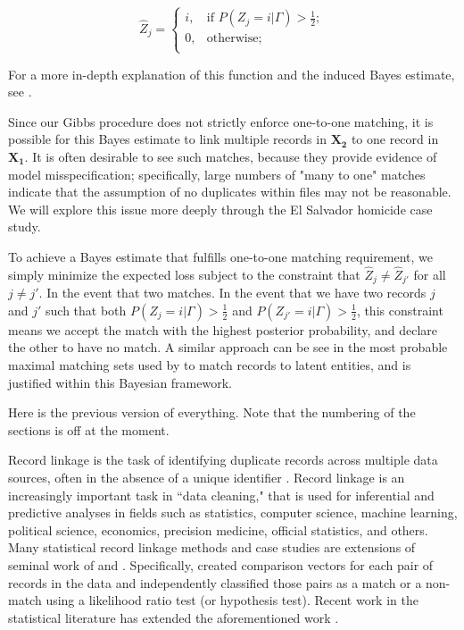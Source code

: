 \documentclass[12pt,letterpaper]{article}
\newcommand{\1}[1]{\mathbb{I}\!\left[#1\right]} %
\begin{document}
{\[\hat{Z}_j =\begin{cases} 
	i,  & \text{if } P(Z_j = i |\Gamma) > \frac{1}{2}; \\
	0,  & \text{otherwise} ; \\
\end{cases}\]

For a more in-depth explanation of this function and the induced Bayes
estimate, see \citep{sadinle_bayesian_2017}.

Since our Gibbs procedure does not strictly enforce one-to-one matching, it is possible for this Bayes estimate to link multiple records in $\bm{X_2}$ to one record in $\bm{X_1}$. It is often desirable to see such matches, because they provide evidence of model misspecification; specifically, large numbers of "many to one" matches indicate that the assumption of no duplicates within files may not be reasonable. We will explore this issue more deeply through the El Salvador homicide case study. 

To achieve a Bayes estimate that fulfills one-to-one matching requirement, we simply minimize the expected loss subject to the constraint that $\hat{Z}_j \neq \hat{Z}_{j'}$ for all $j \neq j'$. In the event that two matches. In the event that we have two records $j$ and $j'$ such that both $P(Z_j = i |\Gamma) > \frac{1}{2}$ and $ P(Z_{j'} = i |\Gamma) > \frac{1}{2}$, this constraint means we accept the match with the highest posterior probability, and declare the other to have no match.  A similar approach can be see in the most probable maximal matching sets used by \citep{steorts_2013} to match records to latent entities, and is justified within this Bayesian framework.

}

\newpage
{
\color{red}
Here is the previous version of everything. Note that the numbering of the sections is off at the moment. 
}



Record linkage is the task of identifying duplicate records across multiple data sources, often in the absence of a unique identifier \citep{christen_2012}. Record linkage is an increasingly important task in ``data cleaning," that is used for inferential and predictive analyses in fields such as statistics, computer science, machine learning, political science, economics, precision medicine, official statistics, and others. Many statistical record linkage methods and case studies are extensions of seminal work of \cite{fellegi_theory_1969} and \cite{newcombe_automatic_1959}. Specifically, \cite{fellegi_theory_1969} created comparison vectors for each pair of records in the data and independently classified those pairs as a match or a non-match using a likelihood ratio test (or hypothesis test). Recent work in the statistical literature has extended the aforementioned work \citep{winkler1991application, fair2004generalized, wagner2014person, gill2003english}. 
\end{document}
